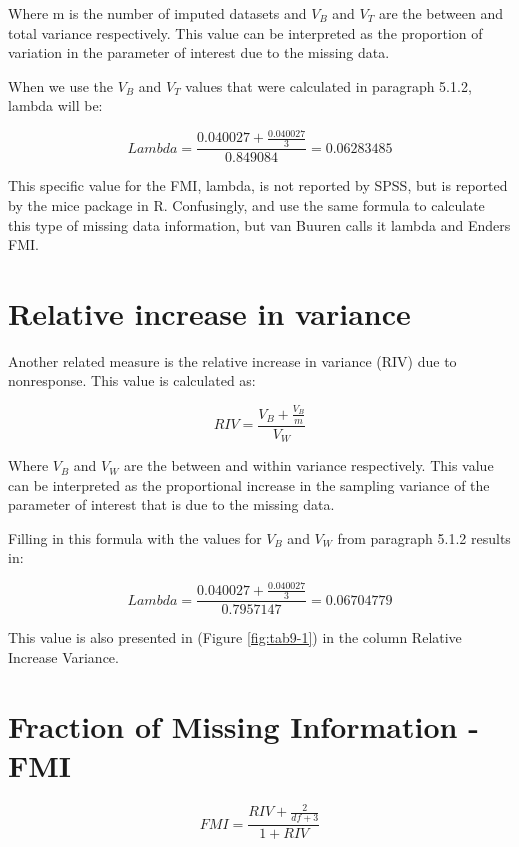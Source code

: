 \documentclass[]{book}
\begin{document}
Where m is the number of imputed datasets and \({V_B}\) and \({V_T}\)
are the between and total variance respectively. This value can be
interpreted as the proportion of variation in the parameter of interest
due to the missing data.

When we use the \({V_B}\) and \({V_T}\) values that were calculated in
paragraph 5.1.2, lambda will be:

\[Lambda = \frac{0.040027 + \frac{0.040027}{3}}{0.849084}=0.06283485\]

This specific value for the FMI, lambda, is not reported by SPSS, but is
reported by the mice package in R. Confusingly, \citet{VanBuuren2018}
and \citet{enders2010applied} use the same formula to calculate this
type of missing data information, but van Buuren calls it lambda and
Enders FMI.

\section{Relative increase in
variance}\label{relative-increase-in-variance}

Another related measure is the relative increase in variance (RIV) due
to nonresponse. This value is calculated as:

\begin{equation}
RIV = \frac{V_B + \frac{V_B}{m}}{V_W}
  \label{eq:riv}
\end{equation}

Where \({V_B}\) and \({V_W}\) are the between and within variance
respectively. This value can be interpreted as the proportional increase
in the sampling variance of the parameter of interest that is due to the
missing data.

Filling in this formula with the values for \({V_B}\) and \({V_W}\) from
paragraph 5.1.2 results in:

\[Lambda = \frac{0.040027 + \frac{0.040027}{3}}{0.7957147}=0.06704779\]

This value is also presented in (Figure \ref{fig:tab9-1}) in the column
Relative Increase Variance.

\section{Fraction of Missing Information -
FMI}\label{fraction-of-missing-information---fmi}

\begin{equation}
FMI = \frac{RIV + \frac{2}{df+3}}{1+RIV}
  \label{eq:fmi}
\end{equation}
\end{document}
